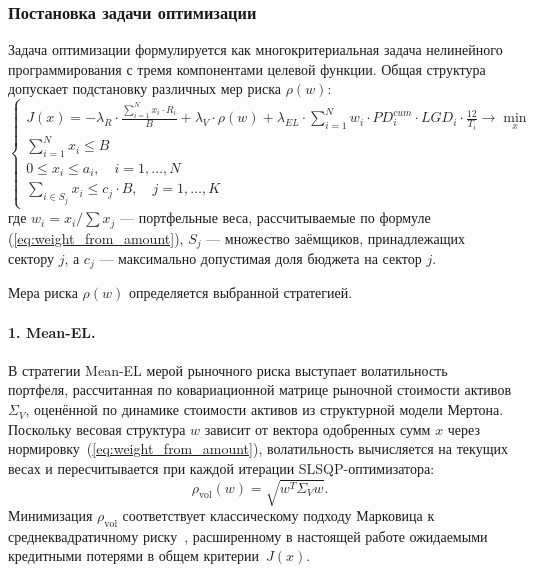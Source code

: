 \documentclass[]{article}
\begin{document}
	\subsubsection{Постановка задачи оптимизации}

	Задача оптимизации формулируется как многокритериальная задача нелинейного программирования
	с тремя компонентами целевой функции. Общая структура допускает подстановку различных мер
	риска $\rho(w)$:
	\begin{equation}
		\label{eq:raroc_opt}
		\begin{cases}
			J(x) = -\lambda_R \cdot \displaystyle\frac{\sum_{i=1}^N x_i \cdot R_i}{B}
			+ \lambda_V \cdot \rho(w)
			+ \lambda_{EL} \cdot \sum_{i=1}^N w_i \cdot PD_i^{cum} \cdot LGD_i \cdot \frac{12}{T_i} \to \min_x \\[8pt]
			\displaystyle\sum_{i=1}^N x_i \leq B \\[4pt]
			0 \leq x_i \leq a_i, \quad i = 1, \dots, N \\[4pt]
			\displaystyle\sum_{i \in S_j} x_i \leq c_j \cdot B, \quad j = 1, \dots, K
		\end{cases}
	\end{equation}
	где $w_i = x_i / \sum x_j$ --- портфельные веса, рассчитываемые по формуле
	(\ref{eq:weight_from_amount}), $S_j$ --- множество заёмщиков, принадлежащих сектору $j$,
	а $c_j$ --- максимально допустимая доля бюджета на сектор $j$.

	Мера риска $\rho(w)$ определяется выбранной стратегией.

	\paragraph{1. Mean-EL.}
	В стратегии Mean-EL мерой рыночного риска выступает волатильность портфеля, рассчитанная по
	ковариационной матрице рыночной стоимости активов $\Sigma_V$, оценённой по динамике стоимости
	активов из структурной модели Мертона. Поскольку весовая структура $w$ зависит от вектора
	одобренных сумм $x$ через нормировку~(\ref{eq:weight_from_amount}), волатильность вычисляется
	на текущих весах и пересчитывается при каждой итерации SLSQP-оптимизатора:
	\begin{equation}
		\label{eq:rho_vol}
		\rho_{\text{vol}}(w) = \sqrt{w^T \Sigma_V w}.
	\end{equation}
	Минимизация $\rho_{\text{vol}}$ соответствует классическому подходу Марковица к среднеквадратичному
	риску~\cite{markowitz1952}, расширенному в настоящей работе ожидаемыми кредитными потерями в
	общем критерии~$J(x)$.
\end{document}
